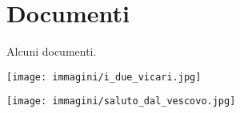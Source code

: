 \chapter{Documenti}
\label{chap:Documenti}
Alcuni documenti.



\newpage
\begin{center}
\texttt{[image: immagini/i\_due\_vicari.jpg]}%
\end{center}
\newpage


\newpage
\begin{center}
\texttt{[image: immagini/saluto\_dal\_vescovo.jpg]}%
\end{center}
\newpage